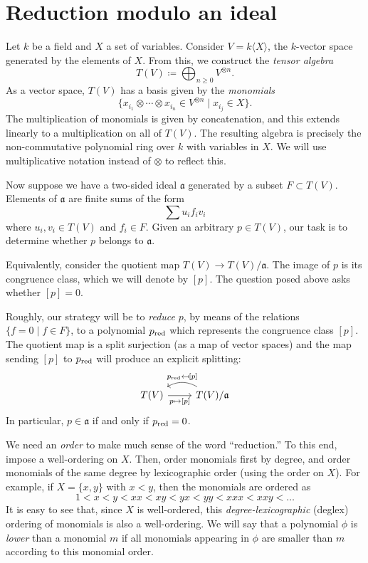 \section{Reduction modulo an ideal}\label{sec:grobner-theorem}
Let $k$ be a field and $X$ a set of variables. Consider $V = k\langle X \rangle$, the $k$-vector space generated by the elements of $X$. From this, we construct the \emph{tensor algebra}
\[
	T(V) \coloneqq \bigoplus_{n\geq 0} V^{\otimes n}.
\]
As a vector space, $T(V)$ has a basis given by the \emph{monomials}
\[
	\{x_{i_1}\otimes \cdots \otimes x_{i_n} \in V^{\otimes n} \mid x_{i_j} \in X\}.
\]
The multiplication of monomials is given by concatenation, and this extends linearly to a multiplication on all of $T(V)$. The resulting algebra is precisely the non-commutative polynomial ring over $k$ with variables in $X$. We will use multiplicative notation instead of $\otimes$ to reflect this.

Now suppose we have a two-sided ideal $\mathfrak{a}$ generated by a subset $F\subset T(V)$. Elements of $\mathfrak{a}$ are finite sums of the form
\[
	\sum u_i f_i v_i
\]
where $u_i, v_i \in T(V)$ and $f_i \in F$.
Given an arbitrary $p\in T(V)$, our task is to determine whether $p$ belongs to $\mathfrak{a}$.

Equivalently, consider the quotient map $T(V) \to T(V)/\mathfrak{a}$. The image of $p$ is its congruence class, which we will denote by $[p]$. The question posed above asks whether $[p]=0$.

Roughly, our strategy will be to \emph{reduce} $p$, by means of the relations $\{f=0 \mid f\in F\}$, to a polynomial $p_{\mathrm{red}}$ which represents the congruence class $[p]$. The quotient map is a split surjection (as a map of vector spaces) and the map sending $[p]$ to $p_{\mathrm{red}}$ will produce an explicit splitting:
\[\begin{tikzcd}
	T(V) \arrow[r, "p \mapsto {[p]}",swap] & \arrow[l,bend right, swap," p_\red \mapsfrom {[p]}"] T(V)/\mathfrak{a}
\end{tikzcd}\]
In particular, $p \in \mathfrak{a}$ if and only if $p_{\mathrm{red}} = 0$.

We need an \emph{order} to make much sense of the word ``reduction.'' To this end, impose a well-ordering on $X$. Then, order monomials first by degree, and order monomials of the same degree by lexicographic order (using the order on $X$). For example, if $X = \{x,y\}$ with $x < y$, then the monomials are ordered as
\[
	1 < x < y < xx < xy < yx < yy < xxx < xxy < \ldots
\]
It is easy to see that, since $X$ is well-ordered, this \emph{degree-lexicographic} (deglex) ordering of monomials is also a well-ordering. We will say that a polynomial $\phi$ is \emph{lower} than a monomial $m$ if all monomials appearing in $\phi$ are smaller than $m$ according to this monomial order.

